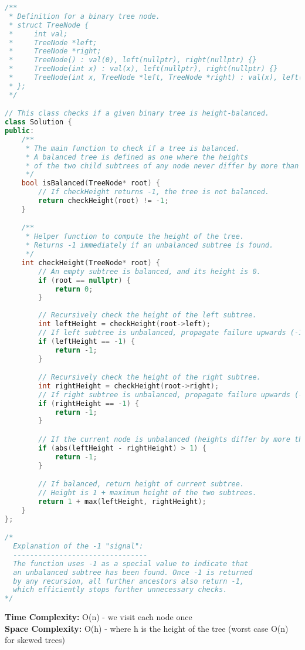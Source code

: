 \documentclass[11pt]{article}
\begin{document}
{\small
\begin{lstlisting}[language=C++]
/**
 * Definition for a binary tree node.
 * struct TreeNode {
 *     int val;
 *     TreeNode *left;
 *     TreeNode *right;
 *     TreeNode() : val(0), left(nullptr), right(nullptr) {}
 *     TreeNode(int x) : val(x), left(nullptr), right(nullptr) {}
 *     TreeNode(int x, TreeNode *left, TreeNode *right) : val(x), left(left), right(right) {}
 * };
 */

// This class checks if a given binary tree is height-balanced.
class Solution {
public:
    /**
     * The main function to check if a tree is balanced.
     * A balanced tree is defined as one where the heights
     * of the two child subtrees of any node never differ by more than one.
     */
    bool isBalanced(TreeNode* root) {
        // If checkHeight returns -1, the tree is not balanced.
        return checkHeight(root) != -1;
    }

    /**
     * Helper function to compute the height of the tree.
     * Returns -1 immediately if an unbalanced subtree is found.
     */
    int checkHeight(TreeNode* root) {
        // An empty subtree is balanced, and its height is 0.
        if (root == nullptr) {
            return 0;
        }
        
        // Recursively check the height of the left subtree.
        int leftHeight = checkHeight(root->left);
        // If left subtree is unbalanced, propagate failure upwards (-1).
        if (leftHeight == -1) {
            return -1;      
        }

        // Recursively check the height of the right subtree.
        int rightHeight = checkHeight(root->right);
        // If right subtree is unbalanced, propagate failure upwards (-1).
        if (rightHeight == -1) {
            return -1;
        }

        // If the current node is unbalanced (heights differ by more than 1), report unbalanced.
        if (abs(leftHeight - rightHeight) > 1) {
            return -1;
        }

        // If balanced, return height of current subtree.
        // Height is 1 + maximum height of the two subtrees.
        return 1 + max(leftHeight, rightHeight);
    }
};

/*
  Explanation of the -1 "signal":
  --------------------------------
  The function uses -1 as a special value to indicate that 
  an unbalanced subtree has been found. Once -1 is returned 
  by any recursion, all further ancestors also return -1,
  which efficiently stops further unnecessary checks.
*/
\end{lstlisting}
}

\textbf{Time Complexity:} O(n) - we visit each node once\\
\textbf{Space Complexity:} O(h) - where h is the height of the tree (worst case O(n) for skewed trees)

\newpage
\end{document}
